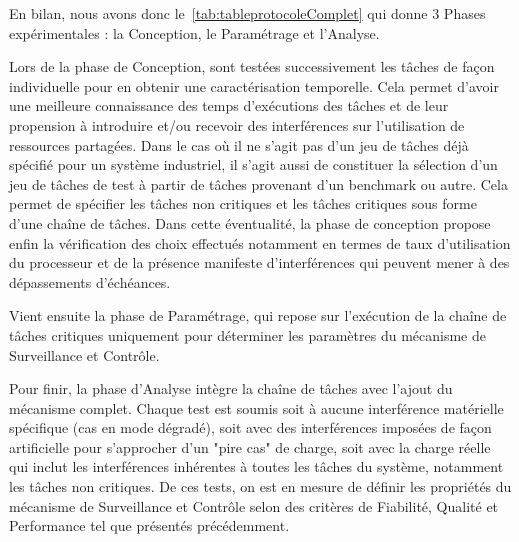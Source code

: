 \documentclass[french, a4paper, 11pt, twoside, pdftex]{StyleThese}
\begin{document}
   	En bilan, nous avons donc le~\autoref{tab:tableprotocoleComplet} qui donne 3 Phases expérimentales : la Conception, le Paramétrage et l'Analyse. 
   	
   	Lors de la phase de Conception, sont testées successivement les tâches de façon individuelle pour en obtenir une caractérisation temporelle. Cela permet d'avoir une meilleure connaissance des temps d'exécutions des tâches et de leur propension à introduire et/ou recevoir des interférences sur l'utilisation de ressources partagées. Dans le cas où il ne s'agit pas d'un jeu de tâches déjà spécifié pour un système industriel, il s'agit aussi de constituer la sélection d'un jeu de tâches de test à partir de tâches provenant d'un benchmark ou autre. Cela permet de spécifier les tâches non critiques et les tâches critiques sous forme d'une chaîne de tâches. Dans cette éventualité, la phase de conception propose enfin la vérification des choix effectués notamment en termes de taux d'utilisation du processeur et de la présence manifeste d'interférences qui peuvent mener à des dépassements d'échéances.
   	
   	Vient ensuite la phase de Paramétrage, qui repose sur l'exécution de la chaîne de tâches critiques uniquement pour déterminer les paramètres du mécanisme de Surveillance et Contrôle.
   	
   	Pour finir, la phase d'Analyse intègre la chaîne de tâches avec l'ajout du mécanisme complet. Chaque test est soumis soit à aucune interférence matérielle spécifique (cas en mode dégradé), soit avec des interférences imposées de façon artificielle pour s'approcher d'un "pire cas" de charge, soit avec la charge réelle qui inclut les interférences inhérentes à toutes les tâches du système, notamment les tâches non critiques. De ces tests, on est en mesure de définir les propriétés du mécanisme de Surveillance et Contrôle selon des critères de Fiabilité, Qualité et Performance tel que présentés précédemment. 
   	

   	
\ifdefined{}
\else


\end{document}
